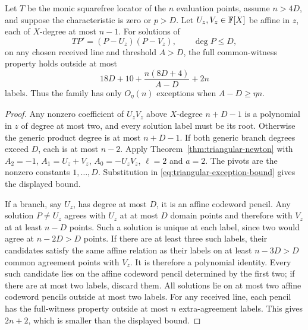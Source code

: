 \begin{corollary}
\label{cor:triangular-two-branch}
Let $T$ be the monic squarefree locator of the $n$ evaluation points,
assume $n>4D$, and suppose the characteristic is zero or $p>D$.
Let $U_z,V_z\in\mathbb F[X]$ be affine in $z$, each of $X$-degree at most
$n-1$. For solutions of
\begin{equation}\label{eq:triangular-two-branch}
 TP'=(P-U_z)(P-V_z),\qquad\deg P\le D,
\end{equation}
on any chosen received line and threshold $A>D$, the full common-witness
property holds outside at most
\[
 18D+10+\frac{n(8D+4)}{A-D}+2n
\]
labels. Thus the family has only $O_\eta(n)$ exceptions when
$A-D\ge\eta n$.
\end{corollary}
\begin{proof}
Any nonzero coefficient of $U_zV_z$ above $X$-degree $n+D-1$ is a
polynomial in $z$ of degree at most two, and every solution label must
be its root. Otherwise the generic product degree is at most $n+D-1$.
If both generic branch degrees exceed $D$, each is at most $n-2$.
Apply Theorem~\ref{thm:triangular-newton} with
$A_2=-1$, $A_1=U_z+V_z$, $A_0=-U_zV_z$, $\ell=2$ and $a=2$.
The pivots are the nonzero constants $1,\ldots,D$. Substitution in
\eqref{eq:triangular-exception-bound} gives the displayed bound.

If a branch, say $U_z$, has degree at most $D$, it is an affine codeword
pencil. Any solution $P\ne U_z$ agrees with $U_z$ at at most $D$ domain
points and therefore with $V_z$ at at least $n-D$ points.
Such a solution is unique at each label, since two would agree at
$n-2D>D$ points. If there are at least three such labels, their
candidates satisfy the same affine relation as their labels on at least
$n-3D>D$ common agreement points with $V_z$. It is therefore a polynomial
identity. Every such candidate lies on the affine codeword pencil
determined by the first two; if there are at most two labels, discard them.
All solutions lie on at most two affine codeword pencils outside at most
two labels. For any received line, each pencil has the full-witness
property outside at most $n$ extra-agreement labels. This gives $2n+2$,
which is smaller than the displayed bound.
\end{proof}


